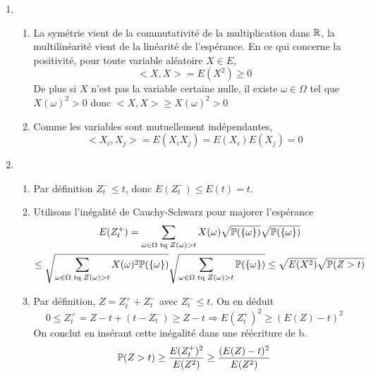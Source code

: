 \begin{enumerate}
  \item 
\begin{enumerate}
  \item La symétrie vient de la commutativité de la multiplication dans $\mathbb{R}$, la multilinéarité vient de la linéarité de l'espérance. En ce qui concerne la positivité, pour toute variable aléatoire $X\in E$,
\begin{displaymath}
  < X, X > = E(X^2) \geq 0
\end{displaymath}
De plus si $X$ n'est pas la variable certaine nulle, il existe $\omega\in \Omega$ tel que $X(\omega)^2>0$ donc $< X, X > \geq X(\omega)^2 > 0$
  \item Comme les variables sont mutuellement indépendantes,
\begin{displaymath}
<X_i,X_j> =  E(X_iX_j) = E(X_i)E(X_j)=0
\end{displaymath}
\end{enumerate}

  \item 
\begin{enumerate}
  \item Par définition $Z_t^-\leq t$, donc $E(Z_t^-)\leq E(t)=t$.
  \item Utilisons l'inégalité de Cauchy-Schwarz pour majorer l'espérance
\begin{multline*}
E(Z_t^+) = 
\sum_{\omega \in \Omega \text{ tq } Z(\omega)>t}X(\omega)\sqrt{\mathbb{P}(\left\{\omega\right\})}\sqrt{\mathbb{P}(\left\{\omega\right\})}\\
\leq \sqrt{\sum_{\omega \in \Omega \text{ tq } Z(\omega)>t}X(\omega)^2\mathbb{P}(\left\{\omega\right\})} 
     \sqrt{\sum_{\omega \in \Omega \text{ tq } Z(\omega)>t}\mathbb{P}(\left\{\omega\right\})}
\leq \sqrt{E(X^2)} \sqrt{\mathbb{P}(Z>t)}
\end{multline*}

  \item Par définition, $Z=Z_t^+ + Z_t^-$ avec $Z_t^-\leq t$. On en déduit
\begin{displaymath}
  0\leq Z_t^+ = Z-t + \left(t-Z_t^- \right) \geq Z-t \Rightarrow E(Z_t^+)^2 \geq (E(Z)-t)^2
\end{displaymath}
On conclut en insérant cette inégalité dans une réécriture de b.
\begin{displaymath}
\mathbb{P}(Z>t) \geq \frac{E(Z_t^+)^2}{E(Z^2)} \geq \frac{(E(Z)-t)^2}{E(Z^2)}  
\end{displaymath}
\end{enumerate}


\end{enumerate}
